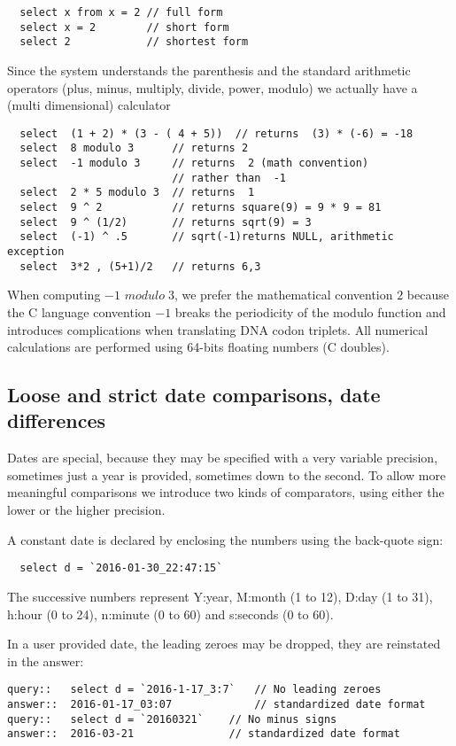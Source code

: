 \documentclass[11pt]{article}
\newcommand{\BL}{\begin{lstlisting}}
\begin{document}
\BL  
  select x from x = 2 // full form
  select x = 2        // short form
  select 2            // shortest form
\end{lstlisting}

Since the system understands the parenthesis and the  standard arithmetic operators
(plus, minus, multiply, divide, power, modulo) 
we actually have a (multi dimensional) calculator

\BL
  select  (1 + 2) * (3 - ( 4 + 5))  // returns  (3) * (-6) = -18
  select  8 modulo 3      // returns 2
  select  -1 modulo 3     // returns  2 (math convention) 
                          // rather than  -1
  select  2 * 5 modulo 3  // returns  1 
  select  9 ^ 2           // returns square(9) = 9 * 9 = 81
  select  9 ^ (1/2)       // returns sqrt(9) = 3
  select  (-1) ^ .5       // sqrt(-1)returns NULL, arithmetic exception
  select  3*2 , (5+1)/2   // returns 6,3
\end{lstlisting}

When computing $-1$ $modulo\; 3$, we prefer the mathematical convention $2$ 
because  the C language convention $-1$  breaks the periodicity of the modulo
function and introduces complications when translating DNA codon triplets.
All numerical calculations are performed using 64-bits floating numbers (C doubles).


\subsection{Loose and strict date comparisons, date differences}

Dates are special, because they may be specified with a very variable precision,
sometimes just a year is provided, sometimes down to the second.
To allow more meaningful comparisons we introduce two kinds of
comparators, using either the lower or the higher precision.

A constant date is declared by enclosing the numbers using the back-quote sign:
\BL
  select d = `2016-01-30_22:47:15`
\end{lstlisting}
The successive numbers represent Y:year, M:month (1 to 12), D:day (1 to 31), h:hour (0 to 24), n:minute (0 to 60) and s:seconds (0 to 60).

In a user provided date, the leading zeroes may be dropped, they are reinstated in the answer:
\BL
query::   select d = `2016-1-17_3:7`   // No leading zeroes
answer::  2016-01-17_03:07             // standardized date format
query::   select d = `20160321`    // No minus signs
answer::  2016-03-21               // standardized date format
\end{lstlisting}
\end{document}
